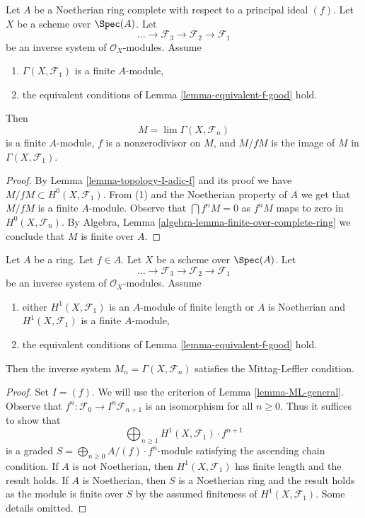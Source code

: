 \begin{lemma}
\label{lemma-limit-finite}
Let $A$ be a Noetherian ring complete with respect to a principal ideal $(f)$.
Let $X$ be a scheme over $\Spec(A)$. Let
$$
\ldots \to \mathcal{F}_3 \to \mathcal{F}_2 \to \mathcal{F}_1
$$
be an inverse system of $\mathcal{O}_X$-modules. Assume
\begin{enumerate}
\item $\Gamma(X, \mathcal{F}_1)$ is a finite $A$-module,
\item the equivalent conditions of Lemma \ref{lemma-equivalent-f-good} hold.
\end{enumerate}
Then
$$
M = \lim \Gamma(X, \mathcal{F}_n)
$$
is a finite $A$-module, $f$ is a nonzerodivisor on $M$, and
$M/fM$ is the image of $M$ in $\Gamma(X, \mathcal{F}_1)$.
\end{lemma}

\begin{proof}
By Lemma \ref{lemma-topology-I-adic-f} and its proof we have
$M/fM \subset H^0(X, \mathcal{F}_1)$. From (1) and the Noetherian
property of $A$ we get that $M/fM$ is a finite $A$-module.
Observe that $\bigcap f^nM = 0$ as $f^nM$ maps to zero in
$H^0(X, \mathcal{F}_n)$. By
Algebra, Lemma \ref{algebra-lemma-finite-over-complete-ring}
we conclude that $M$ is finite over $A$.
\end{proof}

\begin{lemma}
\label{lemma-ML}
Let $A$ be a ring. Let $f \in A$. Let $X$ be a scheme over $\Spec(A)$. Let
$$
\ldots \to \mathcal{F}_3 \to \mathcal{F}_2 \to \mathcal{F}_1
$$
be an inverse system of $\mathcal{O}_X$-modules. Assume
\begin{enumerate}
\item either $H^1(X, \mathcal{F}_1)$ is an $A$-module of finite length
or $A$ is Noetherian and $H^1(X, \mathcal{F}_1)$ is a finite $A$-module,
\item the equivalent conditions of Lemma \ref{lemma-equivalent-f-good} hold.
\end{enumerate}
Then the inverse system $M_n = \Gamma(X, \mathcal{F}_n)$ satisfies the
Mittag-Leffler condition.
\end{lemma}

\begin{proof}
Set $I = (f)$. We will use the criterion of Lemma \ref{lemma-ML-general}.
Observe that $f^n : \mathcal{F}_0 \to I^n\mathcal{F}_{n + 1}$
is an isomorphism for all $n \geq 0$.
Thus it suffices to show that
$$
\bigoplus\nolimits_{n \geq 1} H^1(X, \mathcal{F}_1) \cdot f^{n + 1}
$$
is a graded $S = \bigoplus_{n \geq 0} A/(f) \cdot f^n$-module satisfying the
ascending chain condition. If $A$ is not Noetherian, then
$H^1(X, \mathcal{F}_1)$ has finite length and the result holds.
If $A$ is Noetherian, then $S$ is a Noetherian ring and the result
holds as the module is finite over $S$ by the assumed finiteness
of $H^1(X, \mathcal{F}_1)$. Some details omitted.
\end{proof}

